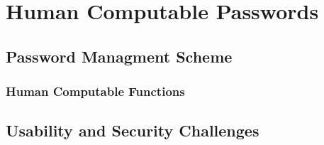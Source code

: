 \chapter{Human Computable Passwords}


\section{Password Managment Scheme}

\subsection{Human Computable Functions}


\section{Usability and Security Challenges}


